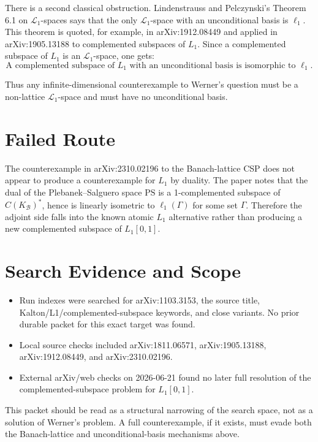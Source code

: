 \documentclass[11pt]{article}
\newcommand{\ellone}{\ell_1}
\newcommand{\Lone}{\mathcal L_1}
\begin{document}
There is a second classical obstruction.  Lindenstrauss and Pelczynski's
Theorem 6.1 on \(\Lone\)-spaces says that the only \(\Lone\)-space with an
unconditional basis is \(\ellone\).  This theorem is quoted, for example, in
arXiv:1912.08449 and applied in arXiv:1905.13188 to complemented subspaces of
\(L_1\).  Since a complemented subspace of \(L_1\) is an \(\Lone\)-space, one
gets:
\[
\boxed{\text{A complemented subspace of \(L_1\) with an unconditional basis is
isomorphic to \(\ellone\).}}
\]

Thus any infinite-dimensional counterexample to Werner's question must be a
non-lattice \(\Lone\)-space and must have no unconditional basis.

\section{Failed Route}

The counterexample in arXiv:2310.02196 to the Banach-lattice CSP does not
appear to produce a counterexample for \(L_1\) by duality.  The paper notes
that the dual of the Plebanek--Salguero space \(\mathrm{PS}\) is a
1-complemented subspace of \(C(K_{\mathcal B})^*\), hence is linearly isometric
to \(\ell_1(\Gamma)\) for some set \(\Gamma\).  Therefore the adjoint side
falls into the known atomic \(L_1\) alternative rather than producing a new
complemented subspace of \(L_1[0,1]\).

\section{Search Evidence and Scope}

\begin{itemize}[leftmargin=*]
\item Run indexes were searched for arXiv:1103.3153, the source title,
Kalton/L1/complemented-subspace keywords, and close variants.  No prior
durable packet for this exact target was found.
\item Local source checks included arXiv:1811.06571, arXiv:1905.13188,
arXiv:1912.08449, and arXiv:2310.02196.
\item External arXiv/web checks on 2026-06-21 found no later full resolution
of the complemented-subspace problem for \(L_1[0,1]\).
\end{itemize}

This packet should be read as a structural narrowing of the search space, not
as a solution of Werner's problem.  A full counterexample, if it exists, must
evade both the Banach-lattice and unconditional-basis mechanisms above.
\end{document}
